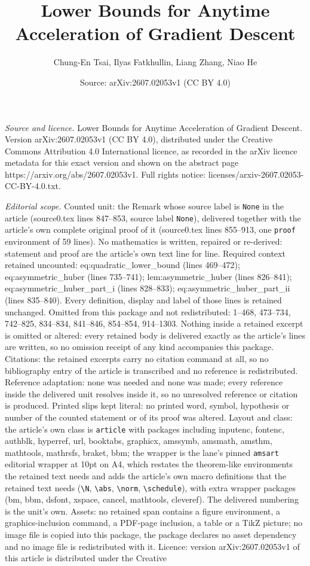 \documentclass[10pt,a4paper]{amsart}
\title[Lower Bounds for Anytime Acceleration of Gradient Descent]{Lower Bounds for Anytime Acceleration of Gradient Descent}
\author{Chung-En Tsai, Ilyas Fatkhullin, Liang Zhang, Niao He}
\date{Source: arXiv:2607.02053v1 (CC BY 4.0)}
\begin{document}
\maketitle

\noindent\emph{Source and licence.} Lower Bounds for Anytime Acceleration of Gradient Descent. Version arXiv:2607.02053v1 (CC BY 4.0), distributed under the Creative Commons Attribution 4.0 International licence, as recorded in the arXiv licence metadata for this exact version and shown on the abstract page https://arxiv.org/abs/2607.02053v1. Full rights notice: licenses/arxiv-2607.02053-CC-BY-4.0.txt.\par\smallskip

\noindent\textit{Editorial scope.} Counted unit: the Remark whose source label is \texttt{None} in the article (source0.tex lines 847--853, source label \texttt{None}), delivered together with the article's own complete original proof of it (source0.tex lines 855--913, one \texttt{proof} environment of 59 lines). No mathematics is written, repaired or re-derived: statement and proof are the article's own text line for line. Required context retained uncounted: eq:quadratic\_lower\_bound (lines 469--472); eq:asymmetric\_huber (lines 735--741); lem:asymmetric\_huber (lines 826--841); eq:asymmetric\_huber\_part\_i (lines 828--833); eq:asymmetric\_huber\_part\_ii (lines 835--840). Every definition, display and label of those lines is retained unchanged. Omitted from this package and not redistributed: 1--468, 473--734, 742--825, 834--834, 841--846, 854--854, 914--1303. Nothing inside a retained excerpt is omitted or altered: every retained body is delivered exactly as the article's lines are written, so no omission receipt of any kind accompanies this package. Citations: the retained excerpts carry no citation command at all, so no bibliography entry of the article is transcribed and no reference is redistributed. Reference adaptation: none was needed and none was made; every reference inside the delivered unit resolves inside it, so no unresolved reference or citation is produced. Printed slips kept literal: no printed word, symbol, hypothesis or number of the counted statement or of its proof was altered. Layout and class: the article's own class is \texttt{article} with packages including inputenc, fontenc, authblk, hyperref, url, booktabs, graphicx, amssymb, amsmath, amsthm, mathtools, mathrsfs, braket, bbm; the wrapper is the lane's pinned \texttt{amsart} editorial wrapper at 10pt on A4, which restates the theorem-like environments the retained text needs and adds the article's own macro definitions that the retained text needs (\texttt{\textbackslash N}, \texttt{\textbackslash abs}, \texttt{\textbackslash norm}, \texttt{\textbackslash schedule}), with extra wrapper packages (bm, bbm, dsfont, xspace, cancel, mathtools, cleveref). The delivered numbering is the unit's own. Assets: no retained span contains a figure environment, a graphics-inclusion command, a PDF-page inclusion, a table or a TikZ picture; no image file is copied into this package, the package declares no asset dependency and no image file is redistributed with it. Licence: version arXiv:2607.02053v1 of this article is distributed under the Creative 
\end{document}
